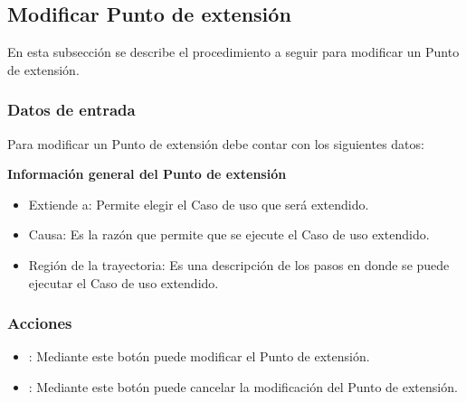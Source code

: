 \subsection{Modificar Punto de extensión}
En esta subsección se describe el procedimiento a seguir para modificar un Punto de extensión.

\subsubsection{Datos de entrada}
\begin{description}
	\item Para modificar un Punto de extensión debe contar con los siguientes datos: \hspace{10pt}
	
	\begin{description}
	    \item \textbf{Información general del Punto de extensión}
	    \begin{itemize}
		  \item Extiende a: Permite elegir el Caso de uso que será extendido.
		  \item Causa: Es la razón que permite que se ejecute el Caso de uso extendido.
		  \item Región de la trayectoria: Es una descripción de los pasos en donde se puede ejecutar el Caso de uso extendido.
	    \end{itemize}
	 \end{description}
\end{description}

\subsubsection{Acciones}
\begin{itemize}
  \item {}: Mediante este botón puede modificar el Punto de extensión.
  \item {}: Mediante este botón puede cancelar la modificación del Punto de extensión.
\end{itemize}
	
	
